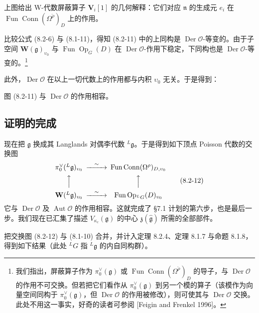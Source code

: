 上图给出 W-代数屏蔽算子 $\mathbf V_i[1]$ 的几何解释：它们对应 $\mathfrak n$ 的生成元 $e_i$ 在 $\operatorname{Fun}\operatorname{Conn}(\Omega^{\check\rho})_D$ 上的作用。

比较公式 (8.2-6) 与 (8.1-11)，得知 (8.2-11) 中的上同构是 $\operatorname{Der}\mathcal O$-等变的。由于子空间 $\mathbf W(\mathfrak g)_{\upsilon_0}$ 与 $\operatorname{Fun}\operatorname{Op}_G(D)$ 在 $\operatorname{Der}\mathcal O$-作用下稳定，下同构也是 $\operatorname{Der}\mathcal O$-等变的。\footnote{我们指出，屏蔽算子作为 $\pi^\vee_0(\mathfrak g)$ 或 $\operatorname{Fun}\operatorname{Conn}(\Omega^{\check\rho})_D$ 的导子，与 $\operatorname{Der}\mathcal O$ 的作用不可交换。但若把它们看作从 $\pi^\vee_0(\mathfrak g)$ 到另一个模的算子（该模作为向量空间同构于 $\pi^\vee_0(\mathfrak g)$，但 $\operatorname{Der}\mathcal O$ 的作用被修改），则可使其与 $\operatorname{Der}\mathcal O$ 交换。此处不用这一事实，好奇的读者可参阅 [Feigin and Frenkel 1996]。}

此外，$\operatorname{Der}\mathcal O$ 在以上一切代数上的作用都与内积 $\upsilon_0$ 无关。于是得到：

\begin{theorem}
    图 (8.2-11) 与 $\operatorname{Der}\mathcal O$ 的作用相容。
\end{theorem}

\subsection{证明的完成}

现在把 $\mathfrak g$ 换成其 Langlands 对偶李代数 ${}^L\mathfrak g$。于是得到如下顶点 Poisson 代数的交换图
\begin{equation}
\begin{CD}
\pi^\vee_0({}^L\mathfrak g)_{\upsilon_0} @>{\sim}>> \operatorname{Fun}\operatorname{Conn}(\Omega^{\rho})_{D,\upsilon_0}\\
@AAA @AAA\\
\mathbf W({}^L\mathfrak g)_{\upsilon_0} @>{\sim}>> \operatorname{Fun}\operatorname{Op}_{{}^LG}(D)_{\upsilon_0}
\end{CD}
\tag{8.2-12}
\end{equation}
它与 $\operatorname{Der}\mathcal O$ 及 $\operatorname{Aut}\mathcal O$ 的作用相容。这就完成了 §7.1 计划的第六步，也是最后一步。我们现在已汇集了描述 $V_{\kappa_c}(\mathfrak g)$ 的中心 $\mathfrak z(\hat{\mathfrak g})$ 所需的全部部件。

把交换图 (8.2-12) 与 (8.1-10) 合并，并计入定理 8.2.4、定理 8.1.7 与命题 8.1.8，得到如下结果（此处 ${}^LG$ 指 ${}^L\mathfrak g$ 的内自同构群）。

